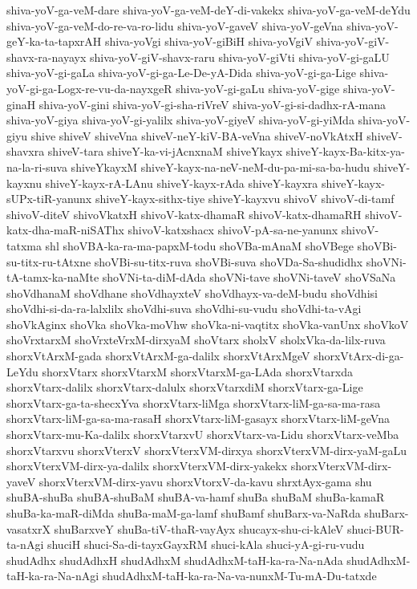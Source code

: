 {shiva-yoV-ga-veM-dare
shiva-yoV-ga-veM-deY-di-vakekx
shiva-yoV-ga-veM-deYdu
shiva-yoV-ga-veM-do-re-va-ro-lidu
shiva-yoV-gaveV
shiva-yoV-geVna
shiva-yoV-geY-ka-ta-tapxrAH
shiva-yoVgi
shiva-yoV-giBiH
shiva-yoVgiV
shiva-yoV-giV-shavx-ra-nayayx
shiva-yoV-giV-shavx-raru
shiva-yoV-giVti
shiva-yoV-gi-gaLU
shiva-yoV-gi-gaLa
shiva-yoV-gi-ga-Le-De-yA-Dida
shiva-yoV-gi-ga-Lige
shiva-yoV-gi-ga-Logx-re-vu-da-nayxgeR
shiva-yoV-gi-gaLu
shiva-yoV-gige
shiva-yoV-ginaH
shiva-yoV-gini
shiva-yoV-gi-sha-riVreV
shiva-yoV-gi-si-dadhx-rA-mana
shiva-yoV-giya
shiva-yoV-gi-yalilx
shiva-yoV-giyeV
shiva-yoV-gi-yiMda
shiva-yoV-giyu
shive
shiveV
shiveVna
shiveV-neY-kiV-BA-veVna
shiveV-noVkAtxH
shiveV-shavxra
shiveV-tara
shiveY-ka-vi-jAcnxnaM
shiveYkayx
shiveY-kayx-Ba-kitx-ya-na-la-ri-suva
shiveYkayxM
shiveY-kayx-na-neV-neM-du-pa-mi-sa-ba-hudu
shiveY-kayxnu
shiveY-kayx-rA-LAnu
shiveY-kayx-rAda
shiveY-kayxra
shiveY-kayx-sUPx-tiR-yanunx
shiveY-kayx-sithx-tiye
shiveY-kayxvu
shivoV
shivoV-di-tamf
shivoV-diteV
shivoVkatxH
shivoV-katx-dhamaR
shivoV-katx-dhamaRH
shivoV-katx-dha-maR-niSAThx
shivoV-katxshacx
shivoV-pA-sa-ne-yanunx
shivoV-tatxma
shl
shoVBA-ka-ra-ma-papxM-todu
shoVBa-mAnaM
shoVBege
shoVBi-su-titx-ru-tAtxne
shoVBi-su-titx-ruva
shoVBi-suva
shoVDa-Sa-shudidhx
shoVNi-tA-tamx-ka-naMte
shoVNi-ta-diM-dAda
shoVNi-tave
shoVNi-taveV
shoVSaNa
shoVdhanaM
shoVdhane
shoVdhayxteV
shoVdhayx-va-deM-budu
shoVdhisi
shoVdhi-si-da-ra-lalxlilx
shoVdhi-suva
shoVdhi-su-vudu
shoVdhi-ta-vAgi
shoVkAginx
shoVka
shoVka-moVhw
shoVka-ni-vaqtitx
shoVka-vanUnx
shoVkoV
shoVrxtarxM
shoVrxteVrxM-dirxyaM
shoVtarx
sholxV
sholxVka-da-lilx-ruva
shorxVtArxM-gada
shorxVtArxM-ga-dalilx
shorxVtArxMgeV
shorxVtArx-di-ga-LeYdu
shorxVtarx
shorxVtarxM
shorxVtarxM-ga-LAda
shorxVtarxda
shorxVtarx-dalilx
shorxVtarx-dalulx
shorxVtarxdiM
shorxVtarx-ga-Lige
shorxVtarx-ga-ta-shecxYva
shorxVtarx-liMga
shorxVtarx-liM-ga-sa-ma-rasa
shorxVtarx-liM-ga-sa-ma-rasaH
shorxVtarx-liM-gasayx
shorxVtarx-liM-geVna
shorxVtarx-mu-Ka-dalilx
shorxVtarxvU
shorxVtarx-va-Lidu
shorxVtarx-veMba
shorxVtarxvu
shorxVterxV
shorxVterxVM-dirxya
shorxVterxVM-dirx-yaM-gaLu
shorxVterxVM-dirx-ya-dalilx
shorxVterxVM-dirx-yakekx
shorxVterxVM-dirx-yaveV
shorxVterxVM-dirx-yavu
shorxVtorxV-da-kavu
shrxtAyx-gama
shu
shuBA-shuBa
shuBA-shuBaM
shuBA-va-hamf
shuBa
shuBaM
shuBa-kamaR
shuBa-ka-maR-diMda
shuBa-maM-ga-lamf
shuBamf
shuBarx-va-NaRda
shuBarx-vasatxrX
shuBarxveY
shuBa-tiV-thaR-vayAyx
shucayx-shu-ci-kAleV
shuci-BUR-ta-nAgi
shuciH
shuci-Sa-di-tayxGayxRM
shuci-kAla
shuci-yA-gi-ru-vudu
shudAdhx
shudAdhxH
shudAdhxM
shudAdhxM-taH-ka-ra-Na-nAda
shudAdhxM-taH-ka-ra-Na-nAgi
shudAdhxM-taH-ka-ra-Na-va-nunxM-Tu-mA-Du-tatxde
}
